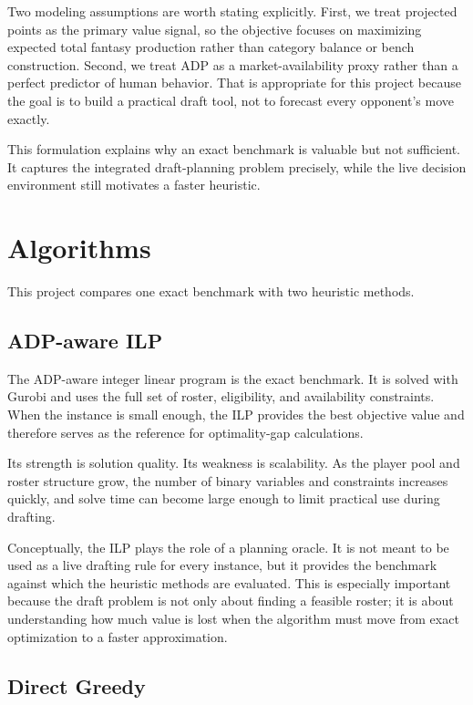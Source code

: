 \documentclass[10pt,a4paper]{article}
\begin{document}
Two modeling assumptions are worth stating explicitly. First, we treat projected points as the primary value signal, so the objective focuses on maximizing expected total fantasy production rather than category balance or bench construction. Second, we treat ADP as a market-availability proxy rather than a perfect predictor of human behavior. That is appropriate for this project because the goal is to build a practical draft tool, not to forecast every opponent's move exactly.

This formulation explains why an exact benchmark is valuable but not sufficient. It captures the integrated draft-planning problem precisely, while the live decision environment still motivates a faster heuristic.

\section{Algorithms}

This project compares one exact benchmark with two heuristic methods.

\subsection{ADP-aware ILP}

The ADP-aware integer linear program is the exact benchmark. It is solved with Gurobi and uses the full set of roster, eligibility, and availability constraints. When the instance is small enough, the ILP provides the best objective value and therefore serves as the reference for optimality-gap calculations.

Its strength is solution quality. Its weakness is scalability. As the player pool and roster structure grow, the number of binary variables and constraints increases quickly, and solve time can become large enough to limit practical use during drafting.

Conceptually, the ILP plays the role of a planning oracle. It is not meant to be used as a live drafting rule for every instance, but it provides the benchmark against which the heuristic methods are evaluated. This is especially important because the draft problem is not only about finding a feasible roster; it is about understanding how much value is lost when the algorithm must move from exact optimization to a faster approximation.

\subsection{Direct Greedy}
\end{document}
